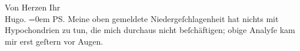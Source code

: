 \pstart
           Von Herzen Ihr{\\[\baselineskip]}\spacefill\mbox{Hugo.}\pend
           \leftskip=0em{}
\pstart
           \noindent{}\textsc{PS}. Meine oben gemeldete Niedergeſchlagenheit hat nichts
                  mit Hypochondrien zu tun, die mich durchaus nicht beſchäftigen; obige Analyſe kam
                  mir erst geſtern vor Augen.\pend
           \endnumbering{}  \newcommand{\dateiname}{L02182}\newcommand{\titel}{Hugo von Hofmannsthal an Arthur Schnitzler, [13. 6. 1914]}\newcommand{\editorInnen}{Martin Anton Müller und Gerd-Hermann Susen}
